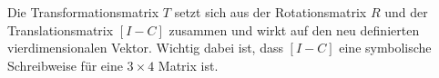 Die Transformationsmatrix $T$ setzt sich aus der Rotationsmatrix $R$ und der Translationsmatrix  $[I -C]$ zusammen und wirkt auf den neu definierten vierdimensionalen Vektor. Wichtig dabei ist, dass $[I -C]$ eine symbolische Schreibweise für eine $3 \times 4$ Matrix ist.   




